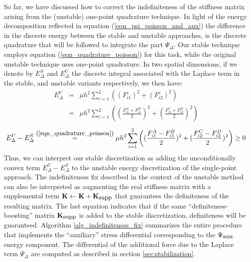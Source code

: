 So far, we have discussed how to correct the indefiniteness of the stiffness matrix arising from the (unstable) one-point quadrature technique. In light of the energy decomposition reflected
in equation (\ref{eqn_psi_poisson_and_aux}) the difference in the discrete energy between the stable and unstable approaches, is the discrete quadrature that will be followed to
integrate the part $\Psi_\Delta$. Our stable technique employs equation (\ref{eqn_quadrature_poisson}) for this task, while the original unstable technique uses one-point
quadrature. In two spatial dimensions, if we denote by $E_\Delta^S$ and $E_\Delta^U$ the discrete integral associated with the Laplace term in the stable, and unstable variants
respectively, we then have:
\begin{eqnarray*}
E_\Delta^U&=&\mu h^2\sum_{i=1}^2\left((F_{i1}^e)^2+(F_{i2}^e)^2\right)\\
&=&\mu h^2\sum_{i=1}^2\left((\frac{F_{i1}^A+F_{i1}^B}{2})^2+(\frac{F_{i2}^C+F_{i2}^D}{2})^2\right)
\end{eqnarray*}
$$
E_\Delta^U-E_\Delta^S\stackrel{\mbox{\small(\ref{eqn_quadrature_poisson})}}{=}\mu h^2\sum_{i=1}^2\left((\frac{F_{i1}^A-F_{i1}^B}{2})^2+(\frac{F_{i2}^C-F_{i2}^D}{2})^2\right)\geq 0
$$
Thus, we can interpret our stable discretization as adding the unconditionally convex term $E_\Delta^U-E_\Delta^S$ to the unstable energy discretization of the single-point
approach. The indefiniteness fix described in the context of the unstable method can also be interpreted as augmenting the real stiffness matrix with a supplemental term
$\mathbf{K}\gets\mathbf{K}+\mathbf{K}_{\mbox{\small supp}}$ that guarantees the definiteness of the resulting matrix. The last equation indicates that if the same
``definiteness-boosting'' matrix $\mathbf{K}_{\mbox{\small supp}}$ is added to the stable discretization, definiteness will be guaranteed. Algorithm \ref{alg_indefiniteness_fix}
summarizes the entire procedure that implements the ``auxiliary'' stress differential corresponding to the $\Psi_{\mbox{\small aux}}$ energy component. The differential of the
additional force due to the Laplace term $\Psi_\Delta$ are computed as described in section \ref{sec:stabilization}.
